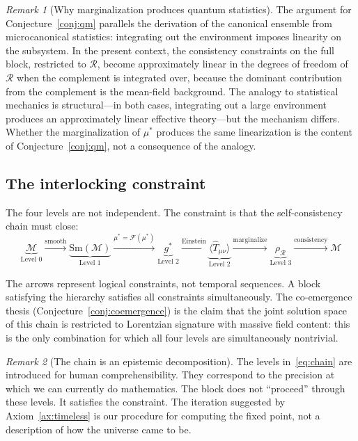 \documentclass[12pt,a4paper]{article}
\theoremstyle{definition}
\theoremstyle{remark}
\newtheorem{remark}{Remark}
\begin{document}
\begin{remark}[Why marginalization produces quantum statistics]
The argument for Conjecture~\ref{conj:qm} parallels the derivation of the
canonical ensemble from microcanonical statistics: integrating out the
environment imposes linearity on the subsystem. In the present context,
the consistency constraints on the full block, restricted to
$\mathcal{R}$, become approximately linear in the degrees of freedom of
$\mathcal{R}$ when the complement is integrated over, because the
dominant contribution from the complement is the mean-field background.
The analogy to statistical mechanics is structural---in both cases,
integrating out a large environment produces an approximately linear
effective theory---but the mechanism differs. Whether the marginalization
of $\mu^*$ produces the same linearization is the content of
Conjecture~\ref{conj:qm}, not a consequence of the analogy.
\end{remark}

\subsection{The interlocking constraint}
\label{sec:interlock}

The four levels are not independent. The constraint is that the
self-consistency chain must close:
\begin{equation}
\underbrace{\mathcal{M}}_{\text{Level 0}}
\xrightarrow{\text{smooth}}
\underbrace{\mathrm{Sm}(\mathcal{M})}_{\text{Level 1}}
\xrightarrow{\mu^* = \mathcal{F}(\mu^*)}
\underbrace{g^*}_{\text{Level 2}}
\xrightarrow{\text{Einstein}}
\underbrace{\langle\hat{T}_{\mu\nu}\rangle}_{\text{Level 2}}
\xrightarrow{\text{marginalize}}
\underbrace{\rho_\mathcal{R}}_{\text{Level 3}}
\xrightarrow{\text{consistency}}
\mathcal{M}
\label{eq:chain}
\end{equation}

The arrows represent logical constraints, not temporal sequences. A
block satisfying the hierarchy satisfies all constraints simultaneously.
The co-emergence thesis (Conjecture~\ref{conj:coemergence}) is the claim
that the joint solution space of this chain is restricted to Lorentzian
signature with massive field content: this is the only combination for
which all four levels are simultaneously nontrivial.

\begin{remark}[The chain is an epistemic decomposition]
The levels in~\eqref{eq:chain} are introduced for human
comprehensibility. They correspond to the precision at which we can
currently do mathematics. The block does not ``proceed'' through these
levels. It satisfies the constraint. The iteration suggested by
Axiom~\ref{ax:timeless} is our procedure for computing the fixed point,
not a description of how the universe came to be.
\end{remark}
\end{document}
